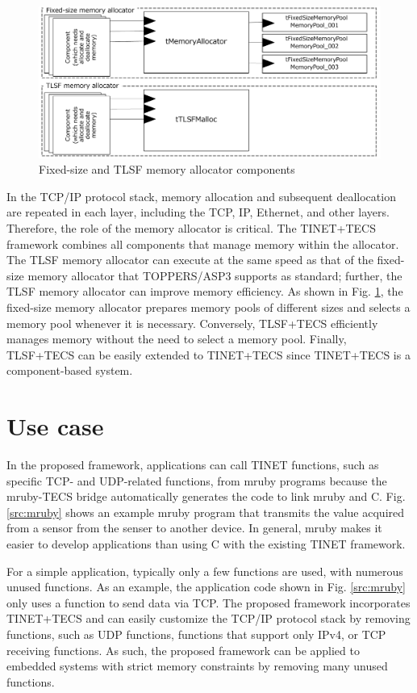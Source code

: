 \documentclass[a4j,12pt,oneside,openany,english]{jsbook}
\begin{document}
\begin{figure}[t]
    \centering
    \includegraphics[width=12cm,clip]{figure/UseCase_TINET.pdf}
    \caption{Fixed-size and TLSF memory allocator components}
    \label{fig:UseCase_TINET}
\end{figure}

In the TCP/IP protocol stack, memory allocation and subsequent deallocation are repeated in each layer, including the TCP, IP, Ethernet, and other layers.
Therefore, the role of the memory allocator is critical.
The TINET+TECS framework combines all components that manage memory within the allocator.
The TLSF memory allocator can execute at the same speed as that of the fixed-size memory allocator that TOPPERS/ASP3 supports as standard; further, the TLSF memory allocator can improve memory efficiency.
As shown in Fig. \ref{fig:UseCase_TINET}, the fixed-size memory allocator prepares memory pools of different sizes and selects a memory pool whenever it is necessary.
Conversely, TLSF+TECS efficiently manages memory without the need to select a memory pool.
Finally, TLSF+TECS can be easily extended to TINET+TECS since TINET+TECS is a component-based system.


\section{Use case}
\label{sec:UseCase}

In the proposed framework, applications can call TINET functions, such as specific TCP- and UDP-related functions, from mruby programs because the mruby-TECS bridge automatically generates the code to link mruby and C.
Fig. \ref{src:mruby} shows an example mruby program that transmits the value acquired from a sensor from the senser to another device.
In general, mruby makes it easier to develop applications than using C with the existing TINET framework.

For a simple application, typically only a few functions are used, with numerous unused functions.
As an example, the application code shown in Fig. \ref{src:mruby} only uses a function to send data via TCP.
The proposed framework incorporates TINET+TECS and can easily customize the TCP/IP protocol stack by removing functions, such as UDP functions, functions that support only IPv4, or TCP receiving functions.
As such, the proposed framework can be applied to embedded systems with strict memory constraints by removing many unused functions.
\end{document}
